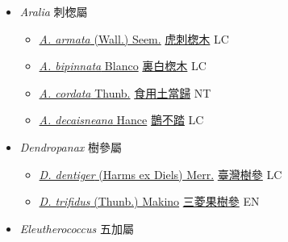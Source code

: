 
  \begin{itemize}
 \item[] \textit{Aralia} 刺楤屬
                    
  \begin{itemize}
        \item[] \href{http://www.theplantlist.org/tpl1.1/search?q=Aralia+armata}{\textit{A. armata} (Wall.) Seem.}   \href{\detokenize{http://taibnet.sinica.edu.tw/chi/taibnet_species_list.php?T2=虎刺楤木&T2_new_value=true&fr=y}}{虎刺楤木} LC
        \item[] \href{http://www.theplantlist.org/tpl1.1/search?q=Aralia+bipinnata}{\textit{A. bipinnata} Blanco}   \href{\detokenize{http://taibnet.sinica.edu.tw/chi/taibnet_species_list.php?T2=裏白楤木&T2_new_value=true&fr=y}}{裏白楤木} LC
        \item[] \href{http://www.theplantlist.org/tpl1.1/search?q=Aralia+cordata}{\textit{A. cordata} Thunb.}   \href{\detokenize{http://taibnet.sinica.edu.tw/chi/taibnet_species_list.php?T2=食用土當歸&T2_new_value=true&fr=y}}{食用土當歸} NT
        \item[] \href{http://www.theplantlist.org/tpl1.1/search?q=Aralia+decaisneana}{\textit{A. decaisneana} Hance}   \href{\detokenize{http://taibnet.sinica.edu.tw/chi/taibnet_species_list.php?T2=鵲不踏&T2_new_value=true&fr=y}}{鵲不踏} LC
  \end{itemize}
 \item[] \textit{Dendropanax} 樹參屬
                    
  \begin{itemize}
        \item[] \href{http://www.theplantlist.org/tpl1.1/search?q=Dendropanax+dentiger}{\textit{D. dentiger} (Harms ex Diels) Merr.}   \href{\detokenize{http://taibnet.sinica.edu.tw/chi/taibnet_species_list.php?T2=臺灣樹參&T2_new_value=true&fr=y}}{臺灣樹參} LC
        \item[] \href{http://www.theplantlist.org/tpl1.1/search?q=Dendropanax+trifidus}{\textit{D. trifidus} (Thunb.) Makino}   \href{\detokenize{http://taibnet.sinica.edu.tw/chi/taibnet_species_list.php?T2=三菱果樹參&T2_new_value=true&fr=y}}{三菱果樹參} EN
  \end{itemize}
 \item[] \textit{Eleutherococcus} 五加屬
                    

\end{itemize}
